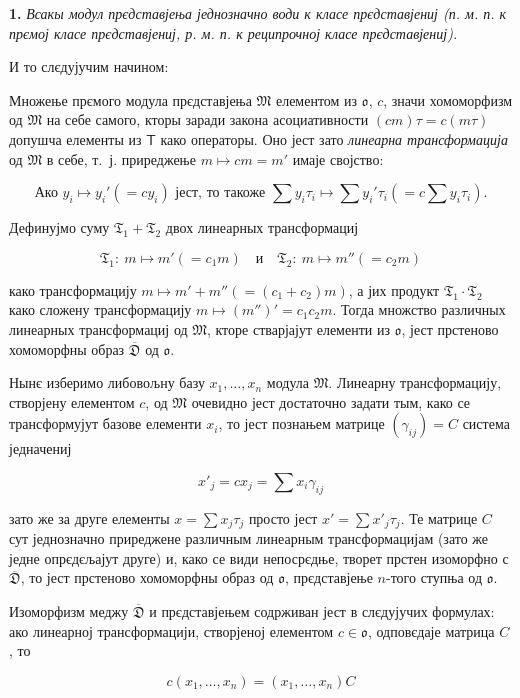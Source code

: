 \documentclass[11pt]{article}
\begin{document}
\textbf{1.} \emph{Всакы модул прєдставјења једнозначно води к класе прєдставјениј (п. м. п. к прємој класе прєдставјениј, р. м. п. к реципрочној класе прєдставјениј).}

И то слєдујучим начином:

Множење прємого модула прєдставјења \(\mathfrak M\) елементом из \(\mathfrak{o}\), \(c\), значи хомоморфизм од \(\mathfrak M\) на себе самого, кторы заради закона асоциативности \((cm)\tau=c(m\tau)\) допушча елементы из \(\mathsf T\) како операторы. Оно јест зато \emph{линеарна трансформација} од \(\mathfrak M\) в себе, т.~ј. приреджење \(m\mapsto cm=m'\) имаје својство:

\[
\text{Ако } y_i\mapsto y_i'(=cy_i) \text{ јест, то такоже }
\sum y_i\tau_i\mapsto \sum y_i'\tau_i\left(=c\sum y_i\tau_i\right).
\]

Дефинујмо суму \(\mathfrak T_1+\mathfrak T_2\) двох линеарных трансформациј

\[
\mathfrak T_1:\ m\mapsto m'(=c_1m)
\quad\text{и}\quad
\mathfrak T_2:\ m\mapsto m''(=c_2m)
\]

како трансформацију \(m\mapsto m'+m''(=(c_1+c_2)m)\), а јих продукт \(\mathfrak T_1\cdot\mathfrak T_2\) како сложену трансформацију \(m\mapsto (m'')'=c_1c_2m\). Тогда множство различных линеарных трансформациј од \(\mathfrak M\), кторе стварјајут елементи из \(\mathfrak{o}\), јест прстеново хомоморфны образ \(\overline{\mathfrak D}\) од \(\mathfrak{o}\).

Нынє изберимо либовољну базу \(x_1,\ldots,x_n\) модула \(\mathfrak M\). Линеарну трансформацију, створјену елементом \(c\), од \(\mathfrak M\) очевидно јест достаточно задати тым, како се трансформујут базове елементи \(x_i\), то јест познањем матрице \((\gamma_{ij})=C\) система једначениј

\[
x'_j=cx_j=\sum x_i\gamma_{ij}
\]

зато же за друге елементы \(x=\sum x_j\tau_j\) просто јест \(x'=\sum x'_j\tau_j\). Те матрице \(C\) сут једнозначно приреджене различным линеарным трансформацијам (зато же једне опрєдєљајут друге) и, како се види непосрєдње, творет прстен изоморфно с \(\overline{\mathfrak D}\), то јест прстеново хомоморфны образ од \(\mathfrak{o}\), прєдставјење \(n\)-того ступња од \(\mathfrak{o}\).

Изоморфизм меджу \(\overline{\mathfrak D}\) и прєдставјењем содрживан јест в слєдујучих формулах: ако линеарној трансформацији, створјеној елементом \(c\in\mathfrak{o}\), одповєдаје матрица \(C\), то

\[
c(x_1,\ldots,x_n)=(x_1,\ldots,x_n)C
\]
\end{document}
